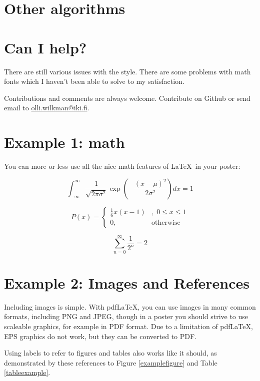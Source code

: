 \documentclass[final]{beamer}
\begin{document}
\begin{poster}
\section{Other algorithms}

\section{Can I help?}
There are still various issues with the style. There are some problems with math fonts which I haven't been able to solve to my satisfaction.

Contributions and comments are always welcome. Contribute on Github or send email to \url{olli.wilkman@iki.fi}.


\newcolumn

\section{Example 1: math}
You can more or less use all the nice math features of \LaTeX~in your poster:

\begin{equation}
	\int_{-\infty}^{\infty} \frac{1}{\sqrt{2 \pi \sigma^2}} \exp\left(-\frac{(x - \mu)^2}{2 \sigma^2} \right) dx = 1
\end{equation}

\begin{equation}
	P(x) = \left\{ \begin{array}{lr} \frac{1}{6}x(x-1)&,\; 0 \leq x \leq 1 \\ 0, & \text{otherwise}  \end{array} \right.
\end{equation}

\begin{equation}
	\sum_{n=0}^\infty \frac{1}{2^n} = 2
\end{equation}



\section{Example 2: Images and References}
Including images is simple.  With pdf\LaTeX, you can use images in many common formats, including PNG and JPEG, though in a poster you should strive to use scaleable graphics, for example in PDF format. Due to a limitation of pdf\LaTeX, EPS graphics do not work, but they can be converted to PDF.
	
Using labels to refer to figures and tables also works like it should, as demonstrated by these references to Figure \ref{examplefigure} and Table \ref{tableexample}.


\end{poster}
\end{document}
